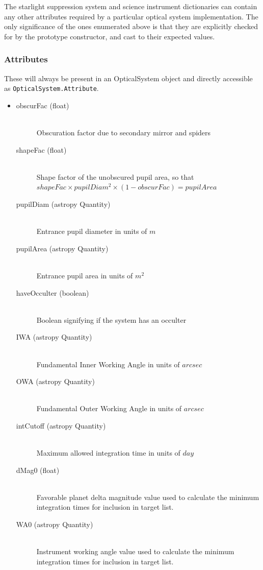 \documentclass[cleanfoot]{asme2ej}
\begin{document}
The starlight suppression system and science instrument dictionaries can contain any other attributes required by a particular optical system implementation.  The only significance of the ones enumerated above is that they are explicitly checked for by the prototype constructor, and cast to their expected values.

\subsubsection*{Attributes}
These will always be present in an OpticalSystem object and directly accessible as \verb+OpticalSystem.Attribute+.
\begin{itemize}
\item 
\begin{description}
    \item[obscurFac (float)] \hfill \\ Obscuration factor due to secondary mirror and spiders
    \item[shapeFac (float)] \hfill \\ Shape factor of the unobscured pupil area, so that $ shapeFac \times pupilDiam^2  \times (1-obscurFac) = pupilArea $
    \item[pupilDiam (astropy Quantity)] \hfill \\ Entrance pupil diameter in units of $ m $
    \item[pupilArea (astropy Quantity)] \hfill \\ Entrance pupil area in units of $ m^{2} $
    \item[haveOcculter (boolean)] \hfill \\ Boolean signifying if the system has an occulter
    \item[IWA (astropy Quantity)] \hfill \\ Fundamental Inner Working Angle in units of $ arcsec $
    \item[OWA (astropy Quantity)] \hfill \\ Fundamental Outer Working Angle in units of $ arcsec $
    \item[intCutoff (astropy Quantity)] \hfill \\ Maximum allowed integration time in units of $ day $
    \item[dMag0 (float)] \hfill \\  Favorable planet delta magnitude value used to calculate the minimum integration times for inclusion in target list.
    \item[WA0 (astropy Quantity)] \hfill \\  Instrument working angle value used to calculate the minimum integration times for inclusion in target list.

\end{description}
\end{itemize}
\end{document}
